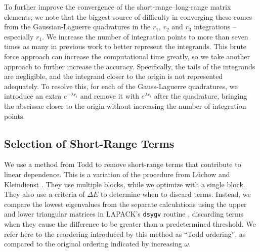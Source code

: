 \documentclass[preprint,showpacs,showkeys,preprintnumbers,amsmath,amssymb,longbibliography,pra,aps]{revtex4-1}
\begin{document}
To further improve the convergence of the short-range--long-range matrix 
elements, we note that the biggest source of difficulty in converging these 
comes from the Gaussian-Laguerre quadratures in the $r_1$, $r_2$ and $r_3$ 
integrations -- especially $r_1$. We increase the number of integration 
points to more than seven times as many in previous work
\cite{VanReeth2003,VanReeth2004} to better represent the integrands. This
brute force approach 
can increase the computational time greatly, so we take another approach to 
further increase the accuracy. Specifically, the tails of the integrands are 
negligible, and the integrand closer to the origin is not represented 
adequately. To resolve this, for each of the Gauss-Laguerre quadratures, we 
introduce an extra $e^{-\lambda r_i}$ and remove it with $e^{\lambda r_i}$ 
after the quadrature, bringing the abscissae closer to the origin without 
increasing the number of integration points.

\subsection{Selection of Short-Range Terms}
\label{sec:Truncation}
We use a method from Todd \cite{Todd2007} to remove short-range terms that 
contribute to linear dependence. This is a variation of the procedure from
L\"uchow and Kleindienst \cite{Luchow1992}. They use multiple blocks, while we 
optimize with a single block. They also use a criteria of $\Delta E$ to 
determine when to discard terms. Instead, we compare the lowest eigenvalues 
from the separate calculations using the upper and lower triangular matrices 
in LAPACK's \texttt{dsygv} routine \cite{LAPACK}, discarding terms when they 
cause the difference to be greater than a predetermined threshold. We refer 
here to the reordering introduced by this method as ``Todd ordering'', as 
compared to the original ordering indicated by increasing $\omega$. 
\end{document}
